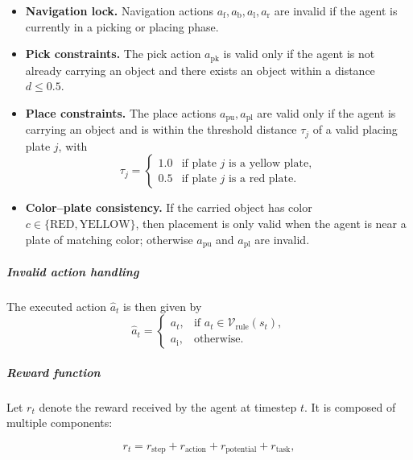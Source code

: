 \documentclass[english, 12pt, a4paper, elec, utf8, a-2b, online]{aaltothesis}
\begin{document}
\begin{itemize}
    \item \textbf{Navigation lock.}  
    Navigation actions $a_{\text{f}},a_{\text{b}},a_{\text{l}},a_{\text{r}}$ are invalid if the agent is currently in a picking or placing phase.

    \item \textbf{Pick constraints.}  
    The pick action $a_{\text{pk}}$ is valid only if the agent is not already carrying an object and there exists an object within a distance $d \leq 0.5$.

    \item \textbf{Place constraints.}  
    The place actions $a_{\text{pu}}, a_{\text{pl}}$ are valid only if the agent is carrying an object and is within the threshold distance $\tau_j$ of a valid placing plate $j$, with  
    \begin{equation}
    \tau_j = 
    \begin{cases}
        1.0 & \text{if plate } j \text{ is a yellow plate}, \\
        0.5 & \text{if plate } j \text{ is a red plate}.
    \end{cases}
    \end{equation}

    \item \textbf{Color–plate consistency.}  
    If the carried object has color $c \in \{\text{RED}, \text{YELLOW}\}$, then placement is only valid when the agent is near a plate of matching color; otherwise $a_{\text{pu}}$ and $a_{\text{pl}}$ are invalid.
\end{itemize}

\subparagraph{Invalid action handling}  
The executed action $\hat{a}_t$ is then given by
\begin{equation}
\hat{a}_t =
\begin{cases}
a_t, & \text{if } a_t \in \mathcal{V}_{\text{rule}}(s_t), \\
a_{\text{i}}, & \text{otherwise}.
\end{cases}
\end{equation}

\subparagraph{Reward function}  
Let $r_t$ denote the reward received by the agent at timestep $t$. It is composed of multiple components:  

\begin{equation}
r_t = r_{\text{step}} + r_{\text{action}} + r_{\text{potential}} + r_{\text{task}},
\end{equation}
\end{document}
